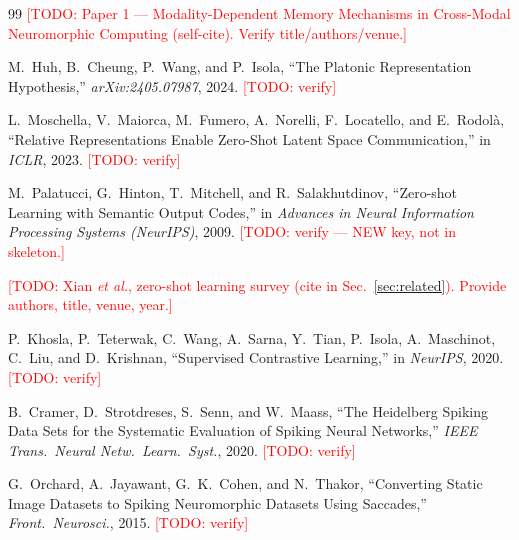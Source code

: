 \documentclass[conference]{IEEEtran}
\newcommand{\todo}[1]{\textcolor{red}{[TODO: #1]}}
\begin{document}
\begin{thebibliography}{99}
\todo{Paper 1 --- Modality-Dependent Memory Mechanisms in Cross-Modal
Neuromorphic Computing (self-cite). Verify title/authors/venue.}

M.~Huh, B.~Cheung, P.~Wang, and P.~Isola, ``The Platonic Representation
Hypothesis,'' \emph{arXiv:2405.07987}, 2024. \todo{verify}

L.~Moschella, V.~Maiorca, M.~Fumero, A.~Norelli, F.~Locatello, and
E.~Rodol{\`a}, ``Relative Representations Enable Zero-Shot Latent Space
Communication,'' in \emph{ICLR}, 2023. \todo{verify}

M.~Palatucci, G.~Hinton, T.~Mitchell, and R.~Salakhutdinov, ``Zero-shot
Learning with Semantic Output Codes,'' in \emph{Advances in Neural
Information Processing Systems (NeurIPS)}, 2009.
\todo{verify --- NEW key, not in skeleton.}

\todo{Xian \emph{et al.}, zero-shot learning survey (cite in
Sec.~\ref{sec:related}). Provide authors, title, venue, year.}

P.~Khosla, P.~Teterwak, C.~Wang, A.~Sarna, Y.~Tian, P.~Isola, A.~Maschinot,
C.~Liu, and D.~Krishnan, ``Supervised Contrastive Learning,'' in
\emph{NeurIPS}, 2020. \todo{verify}

B.~Cramer, D.~Strotdreses, S.~Senn, and W.~Maass, ``The Heidelberg Spiking
Data Sets for the Systematic Evaluation of Spiking Neural Networks,''
\emph{IEEE Trans.\ Neural Netw.\ Learn.\ Syst.}, 2020. \todo{verify}

G.~Orchard, A.~Jayawant, G.~K.~Cohen, and N.~Thakor, ``Converting Static
Image Datasets to Spiking Neuromorphic Datasets Using Saccades,''
\emph{Front.\ Neurosci.}, 2015. \todo{verify}
\end{thebibliography}
\end{document}
